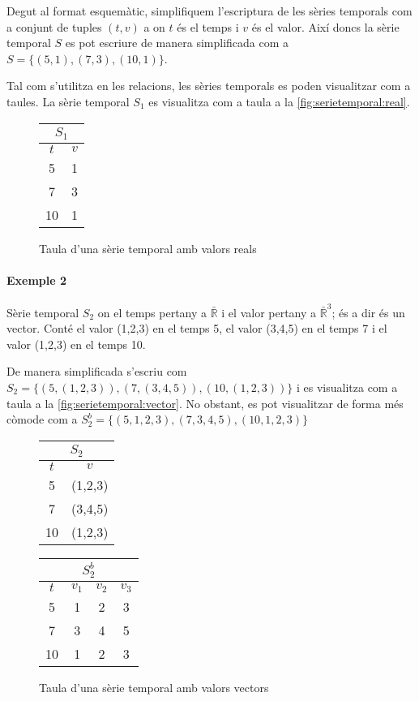 Degut al format esquemàtic, simplifiquem l'escriptura de les sèries temporals com a conjunt de tuples $(t,v)$ a on $t$ és el temps i $v$ és el valor. Així doncs la sèrie temporal $S$ es pot escriure de manera simplificada com a 
$S = \{ (5,1), (7,3), (10,1) \}$.

Tal com s'utilitza en les relacions, les sèries temporals es poden visualitzar com a taules. La sèrie temporal $S_1$ es visualitza com a taula a la \autoref{fig:serietemporal:real}.

\begin{figure}[tp]
  \centering
  \begin{tabular}{|c|c|}
    \multicolumn{2}{c}{$S_1$} \\ \hline
    $t$  & $v$ \\ \hline
    5  & 1 \\
    7  & 3 \\
    10 & 1 \\ \hline
  \end{tabular}
  \caption{Taula d'una sèrie temporal amb valors reals}
  \label{fig:serietemporal:real}
\end{figure}


\paragraph{Exemple 2}
Sèrie temporal $S_2$ on el temps pertany a $\bar{\mathbb{R}}$ i el valor pertany a  $\bar{\mathbb{R}}^3$; és a dir és un vector. Conté el valor (1,2,3) en el temps 5, el valor (3,4,5) en el temps 7 i el valor (1,2,3) en el temps 10.

De manera simplificada s'escriu com 
$S_2 = \{ (5,(1,2,3)), (7,(3,4,5)), (10,(1,2,3)) \}$ i es visualitza com a taula a la \autoref{fig:serietemporal:vector}. No obstant, es pot visualitzar de forma més còmode com a $S_2^b = \{ (5,1,2,3), (7,3,4,5), (10,1,2,3) \}$

\begin{figure}[tp]
  \centering
  \begin{tabular}{|c|c|}
    \multicolumn{2}{c}{$S_2$} \\ \hline
    $t$  & $v$ \\ \hline
    5  & (1,2,3) \\
    7  & (3,4,5) \\
    10 & (1,2,3) \\ \hline
  \end{tabular} \qquad
  \begin{tabular}[tp]{|c|c|c|c|}
   \multicolumn{4}{c}{$S_2^b$} \\ \hline
    $t$  & $v_1$ & $v_2$ & $v_3$ \\ \hline
    5  & 1 & 2 & 3 \\
    7  & 3 & 4 & 5 \\
    10 & 1 & 2 & 3 \\ \hline
  \end{tabular}

  \caption{Taula d'una sèrie temporal amb valors vectors}
  \label{fig:serietemporal:vector}
\end{figure}


